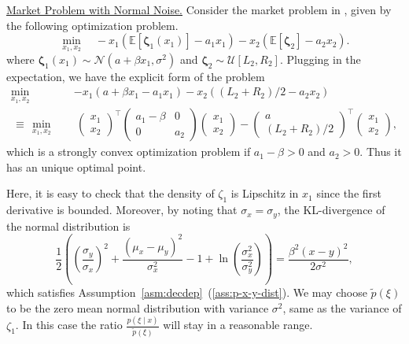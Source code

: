 \documentclass[11pt,reqno]{amsart}
\newcommand{\1}{{\bf 1}}
\newcommand{\2}{{\bf 2}}
\newcommand{\bzeta}{\boldsymbol{\zeta}}
\numberwithin{equation}{section}
\theoremstyle{remark}
\begin{document}
{			\noindent \underline{Market Problem with Normal Noise.} %
			Consider the market problem in \cite{wang2023constrained}, given by the following optimization problem.
			\begin{equation}\label{eq:mkproblem}
				\min_{x_1, x_2} \quad -x_1\left(\mathbb{E}\left[\bzeta_1\left(x_1\right)\right]-a_1 x_1\right)-x_2\left(\mathbb{E}\left[\bzeta_2\right]-a_2 x_2\right).
			\end{equation}
			where ${\bzeta_1(x_1)} \sim \mathcal{N}(a+{\beta} x_1, \sigma^2)$ and ${\bzeta_2} \sim \mathcal{U}[L_2, R_2]$. Plugging in the expectation, we have the explicit form of the problem
			\begin{align}\label{eq:mkproblem2}
				\min_{x_1,x_2}  \quad &-x_1\left(a+{\beta} x_1-a_1 x_1\right)-x_2\left((L_2+R_2)/2-a_2 x_2\right)\nonumber\\
				{\, \equiv \, }  \min_{x_1, x_2} \quad & \ {\begin{pmatrix} x_1 \\ x_2 
					\end{pmatrix}^\top} \begin{pmatrix}
					a_1-{\beta} & 0\\
					0 & a_2
				\end{pmatrix}\begin{pmatrix}
					x_1\\ x_2
				\end{pmatrix}-\begin{pmatrix}
					a \\ (L_2+R_2)/2
				\end{pmatrix}^\top \begin{pmatrix}
					x_1\\ x_2
				\end{pmatrix},
			\end{align}
			which is a strongly convex optimization problem {if $a_1 - \beta > 0$ and $a_2 >0$}. Thus it has an unique optimal point. 
			
			 Here, it is easy to check that the density of $\zeta_1$ is Lipschitz in $x_1$ since the first derivative is bounded. Moreover, {by noting that $\sigma_x = \sigma_y$,} the KL-divergence of the normal distribution is 
			\begin{equation*}
				\frac{1}{2}\left(\left(\frac{\sigma_y}{\sigma_x}\right)^2+\frac{\left(\mu_x-\mu_y\right)^2}{\sigma_x^2}-1+\ln \left(\frac{\sigma_x^2}{\sigma_y^2}\right)\right)=\frac{{\beta}^2 (x-y)^2}{2\sigma^2},
			\end{equation*}
			which satisfies {Assumption~\ref{asm:decdep}~(\ref{ass:p-x-y-dist}).}  We {may} choose $\tilde{p}(\xi)$ to be the zero mean normal distribution with variance $\sigma^2$, same as the variance of $\zeta_1$. In this case the ratio $\frac{p(\xi\mid x)}{\tilde{p}(\xi)}$ will stay in a reasonable range.
			
}
\end{document}
